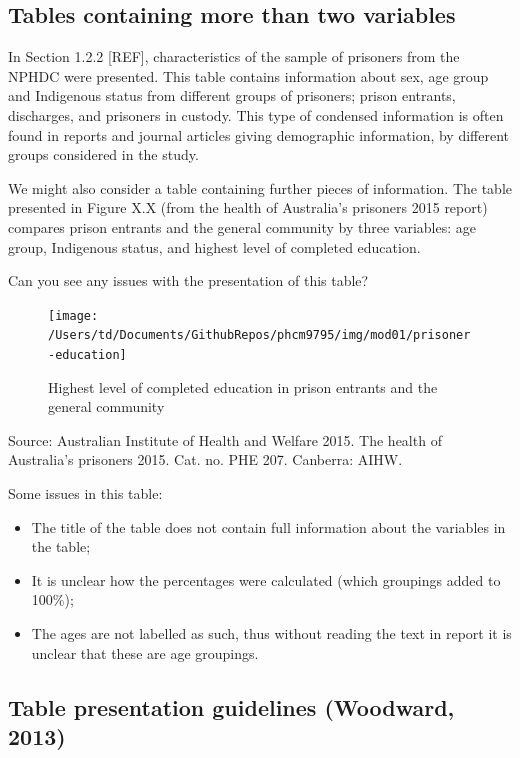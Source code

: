 \documentclass[
]{memoir}
\providecommand{\tightlist}{%
  \setlength{\itemsep}{0pt}\setlength{\parskip}{0pt}}
\begin{document}
\hypertarget{tables-containing-more-than-two-variables}{%
\subsection{Tables containing more than two variables}\label{tables-containing-more-than-two-variables}}

In Section 1.2.2 {[}REF{]}, characteristics of the sample of prisoners from the NPHDC were presented. This table contains information about sex, age group and Indigenous status from different groups of prisoners; prison entrants, discharges, and prisoners in custody. This type of condensed information is often found in reports and journal articles giving demographic information, by different groups considered in the study.

We might also consider a table containing further pieces of information. The table presented in Figure X.X (from the health of Australia's prisoners 2015 report) compares prison entrants and the general community by three variables: age group, Indigenous status, and highest level of completed education.

Can you see any issues with the presentation of this table?

\begin{figure}
\texttt{[image: /Users/td/Documents/GithubRepos/phcm9795/img/mod01/prisoner-education]} \caption{Highest level of completed education in prison entrants and the general community}\label{fig:fig-prison-education}
\end{figure}

Source: Australian Institute of Health and Welfare 2015. The health of Australia's prisoners 2015. Cat. no. PHE 207. Canberra: AIHW.

Some issues in this table:

\begin{itemize}
\tightlist
\item
  The title of the table does not contain full information about the variables in the table;
\item
  It is unclear how the percentages were calculated (which groupings added to 100\%);
\item
  The ages are not labelled as such, thus without reading the text in report it is unclear that these are age groupings.
\end{itemize}

\hypertarget{table-presentation-guidelines-woodward-2013}{%
\subsection{Table presentation guidelines (Woodward, 2013)}\label{table-presentation-guidelines-woodward-2013}}
\end{document}
